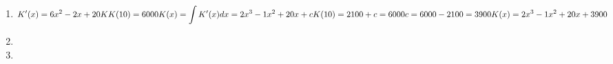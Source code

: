 \documentclass[12pt,a4paper]{scrreprt}
\begin{document}
\begin{enumerate}
\begin{enumerate}
\item %

\[
\int x+\ln x dx
= \int u'v = uv-\int uv'
u'=1
v =\ln x
u =x
v'=\frac{1}{x}
x \cdot \ln x -\int x \frac{1}{x} dx
= x \ln x -\int 1 dx
= x \ln x -x
=x(\ln x -1)
\]

\item %

\[
\int x^2 e^{3x} dx
= \int u'v = uv-\int uv'
u'=e^{3x}
v =x^2
u =\frac{1}{3} e^{3x}
v'=2x
= \int e^{3x} x^2 = \frac{1}{3} e^{3x} x^2 -\frac{2}{3} \int e^{3x} x dx
u'=e^{3x}
v =x
u =\frac{1}{3}e^{3x}
v'=1
\int e^{3x} x dx = \frac{1}{3}e^{3x}-\frac{1}{3}\frac{1}{3}e^{3x}
\int x^2 e^{3x} dx = \frac{1}{3} e^{3x} x^2 -\frac{2}{9}e^{3x}-\frac{1}{9}e^{3x}
\]

\end{enumerate}

\item %

\[
K'(x)=6x^2 -2x +20 \\K
K(10)=6000
K(x)=\int K'(x) dx
= 2x^3 -1x^2 +20x +c
K(10)=2100 +c=6000
c=6000-2100=3900
K(x)=2x^3 -1x^2 +20x +3900
\]

\item %

\item %

\end{enumerate}
\end{document}
